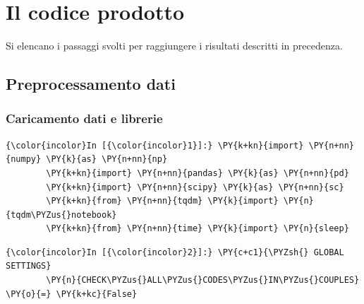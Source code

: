 \documentclass[12pt,a4paper,twoside,openright]{book}
\begin{document}
\chapter{Il codice prodotto}
\label{cap:codice}

Si elencano i passaggi svolti per raggiungere i risultati descritti in precedenza.

\hypertarget{preprocessamento-dati}{%
\section{Preprocessamento dati}\label{preprocessamento-dati}}

    \hypertarget{caricamento-dati-e-librerie}{%
\subsection{Caricamento dati e
librerie}\label{caricamento-dati-e-librerie}}

    \begin{Verbatim}[commandchars=\\\{\}]
{\color{incolor}In [{\color{incolor}1}]:} \PY{k+kn}{import} \PY{n+nn}{numpy} \PY{k}{as} \PY{n+nn}{np}
        \PY{k+kn}{import} \PY{n+nn}{pandas} \PY{k}{as} \PY{n+nn}{pd}
        \PY{k+kn}{import} \PY{n+nn}{scipy} \PY{k}{as} \PY{n+nn}{sc}
        \PY{k+kn}{from} \PY{n+nn}{tqdm} \PY{k}{import} \PY{n}{tqdm\PYZus{}notebook}
        \PY{k+kn}{from} \PY{n+nn}{time} \PY{k}{import} \PY{n}{sleep}
\end{Verbatim}


    \begin{Verbatim}[commandchars=\\\{\}]
{\color{incolor}In [{\color{incolor}2}]:} \PY{c+c1}{\PYZsh{} GLOBAL SETTINGS}
        \PY{n}{CHECK\PYZus{}ALL\PYZus{}CODES\PYZus{}IN\PYZus{}COUPLES} \PY{o}{=} \PY{k+kc}{False}
\end{Verbatim}
\end{document}
